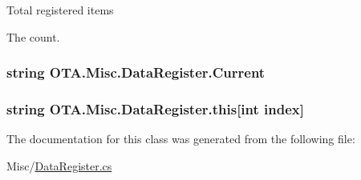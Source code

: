 Total registered items 

The count.\hypertarget{class_o_t_a_1_1_misc_1_1_data_register_a98c85263e49f40d4b96590aaf7682fef}{}
\subsubsection[{Current}]{\setlength{\rightskip}{0pt plus 5cm}string O\+T\+A.\+Misc.\+Data\+Register.\+Current\hspace{0.3cm}{\ttfamily [get]}}\label{class_o_t_a_1_1_misc_1_1_data_register_a98c85263e49f40d4b96590aaf7682fef}
\hypertarget{class_o_t_a_1_1_misc_1_1_data_register_acc9ce0e420a518fa7d183f77c797a974}{}
\subsubsection[{this[int index]}]{\setlength{\rightskip}{0pt plus 5cm}string O\+T\+A.\+Misc.\+Data\+Register.\+this\mbox{[}int index\mbox{]}\hspace{0.3cm}{\ttfamily [get]}}\label{class_o_t_a_1_1_misc_1_1_data_register_acc9ce0e420a518fa7d183f77c797a974}


The documentation for this class was generated from the following file\+:\begin{DoxyCompactItemize}
\item 
Misc/\hyperlink{_data_register_8cs}{Data\+Register.\+cs}\end{DoxyCompactItemize}
